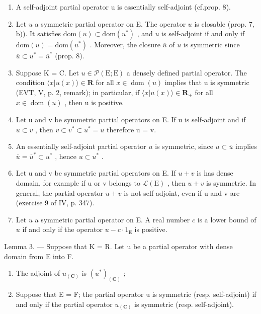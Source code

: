 \begin{enumerate}
\def\labelenumi{\arabic{enumi})}
\setcounter{enumi}{1}
\item
  A self-adjoint partial operator u is essentially self-adjoint (cf.prop. 8).
\item
  Let \(u\) a symmetric partial operator on E. The operator \(u\) is closable (prop. 7, b)). It satisfies \(\text{dom}(u) \subset \text{dom}(u^*)\) , and \(u\) is self-adjoint if and only if \(\text{dom}(u) = \text{dom}(u^*)\) . Moreover, the closure \(\overline{u}\) of \(u\) is symmetric since \(\overline{u} \subset u^* = \overline{u}^*\) (prop. 8).
\item
  Suppose K = C. Let \(u \in \mathcal{P}(\mathrm{E};\mathrm{E})\) a densely defined partial operator. The condition \(\langle x | u(x) \rangle \in \mathbf{R}\) for all \(x \in \operatorname{dom}(u)\) implies that u is symmetric (EVT, V, p. 2, remark); in particular, if \(\langle x | u(x) \rangle \in \mathbf{R}_{+}\) for all \(x \in \operatorname{dom}(u)\) , then u is positive.
\item
  Let u and v be symmetric partial operators on E. If u is self-adjoint and if \(u \subset v\) , then \(v \subset v^{*} \subset u^{*} = u\) therefore u = v.
\item
  An essentially self-adjoint partial operator \(u\) is symmetric, since \(u \subset \overline{u}\) implies \(\overline{u} = \overline{u}^{*} \subset u^{*}\) , hence \(u \subset u^{*}\) .
\item
  Let u and v be symmetric partial operators on E. If \(u+v\) is has dense domain, for example if u or v belongs to \(\mathcal{L}(\mathrm{E})\) , then \(u+v\) is symmetric. In general, the partial operator \(u + v\) is not self-adjoint, even if u and v are (exercise 9 of IV, p. 347).
\item
  Let \(u\) a symmetric partial operator on E. A real number \(c\) is a lower bound of \(u\) if and only if the operator \(u - c \cdot 1_{\mathrm{E}}\) is positive.
\end{enumerate}

Lemma 3. --- Suppose that K = R. Let u be a partial operator with dense domain from E into F.

\begin{enumerate}
\def\labelenumi{\alph{enumi})}
\item
The adjoint of \(u_{(\mathbf C)}\) is \((u^*)_{(\mathbf C)}\) ;
\item
  Suppose that E = F; the partial operator u is symmetric (resp. self-adjoint) if and only if the partial operator \(u_{(\mathbf{C})}\) is symmetric (resp. self-adjoint).
\end{enumerate}

